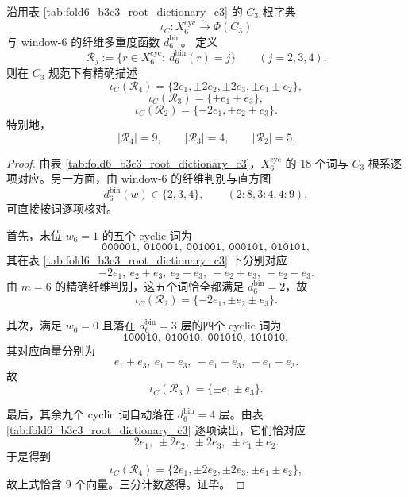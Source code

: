 \begin{theorem}\label{thm:xi-window6-c3-cyclic-fiber-trisection}
沿用表 \ref{tab:fold6_b3c3_root_dictionary_c3} 的 \(C_3\) 根字典
\[
\iota_C:X_6^{\mathrm{cyc}}\xrightarrow{\sim}\Phi(C_3)
\]
与 window-\(6\) 的纤维多重度函数 \(d_6^{\mathrm{bin}}\)。
定义
\[
\mathcal R_j:=\{r\in X_6^{\mathrm{cyc}}:\ d_6^{\mathrm{bin}}(r)=j\}
\qquad(j=2,3,4).
\]
则在 \(C_3\) 规范下有精确描述
\[
\boxed{\;
\iota_C(\mathcal R_4)
=
\{2e_1,\pm 2e_2,\pm 2e_3,\pm e_1\pm e_2\},\;}
\]
\[
\boxed{\;
\iota_C(\mathcal R_3)
=
\{\pm e_1\pm e_3\},\;}
\]
\[
\boxed{\;
\iota_C(\mathcal R_2)
=
\{-2e_1,\pm e_2\pm e_3\}.\;}
\]
特别地，
\[
\boxed{\;
|\mathcal R_4|=9,\qquad |\mathcal R_3|=4,\qquad |\mathcal R_2|=5.\;}
\]
\end{theorem}
\begin{proof}
由表 \ref{tab:fold6_b3c3_root_dictionary_c3}，\(X_6^{\mathrm{cyc}}\) 的 \(18\) 个词与 \(C_3\) 根系逐项对应。另一方面，由 window-\(6\) 的纤维判别与直方图
\[
d_6^{\mathrm{bin}}(w)\in\{2,3,4\},
\qquad
(2:8,3:4,4:9),
\]
可直接按词逐项核对。

首先，末位 \(w_6=1\) 的五个 cyclic 词为
\[
\texttt{000001},\ \texttt{010001},\ \texttt{001001},\ \texttt{000101},\ \texttt{010101},
\]
其在表 \ref{tab:fold6_b3c3_root_dictionary_c3} 下分别对应
\[
-2e_1,\ e_2+e_3,\ e_2-e_3,\ -e_2+e_3,\ -e_2-e_3.
\]
由 \(m=6\) 的精确纤维判别，这五个词恰全都满足 \(d_6^{\mathrm{bin}}=2\)，故
\[
\iota_C(\mathcal R_2)=\{-2e_1,\pm e_2\pm e_3\}.
\]

其次，满足 \(w_6=0\) 且落在 \(d_6^{\mathrm{bin}}=3\) 层的四个 cyclic 词为
\[
\texttt{100010},\ \texttt{010010},\ \texttt{001010},\ \texttt{101010},
\]
其对应向量分别为
\[
e_1+e_3,\ e_1-e_3,\ -e_1+e_3,\ -e_1-e_3.
\]
故
\[
\iota_C(\mathcal R_3)=\{\pm e_1\pm e_3\}.
\]

最后，其余九个 cyclic 词自动落在 \(d_6^{\mathrm{bin}}=4\) 层。由表 \ref{tab:fold6_b3c3_root_dictionary_c3} 逐项读出，它们恰对应
\[
2e_1,\ \pm 2e_2,\ \pm 2e_3,\ \pm e_1\pm e_2.
\]
于是得到
\[
\iota_C(\mathcal R_4)=\{2e_1,\pm 2e_2,\pm 2e_3,\pm e_1\pm e_2\},
\]
故上式恰含 \(9\) 个向量。三分计数遂得。证毕。
\end{proof}

